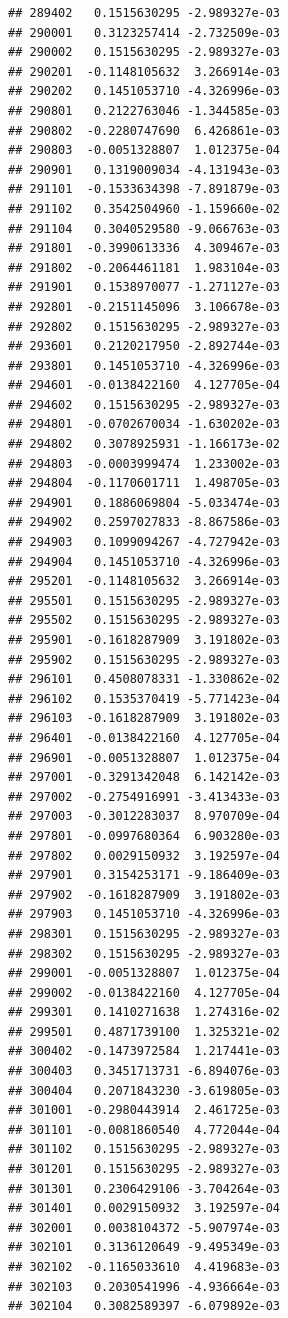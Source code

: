 \documentclass[ignorenonframetext,]{beamer}
\begin{document}
\begin{frame}[fragile]
\begin{verbatim}
## 289402   0.1515630295 -2.989327e-03
## 290001   0.3123257414 -2.732509e-03
## 290002   0.1515630295 -2.989327e-03
## 290201  -0.1148105632  3.266914e-03
## 290202   0.1451053710 -4.326996e-03
## 290801   0.2122763046 -1.344585e-03
## 290802  -0.2280747690  6.426861e-03
## 290803  -0.0051328807  1.012375e-04
## 290901   0.1319009034 -4.131943e-03
## 291101  -0.1533634398 -7.891879e-03
## 291102   0.3542504960 -1.159660e-02
## 291104   0.3040529580 -9.066763e-03
## 291801  -0.3990613336  4.309467e-03
## 291802  -0.2064461181  1.983104e-03
## 291901   0.1538970077 -1.271127e-03
## 292801  -0.2151145096  3.106678e-03
## 292802   0.1515630295 -2.989327e-03
## 293601   0.2120217950 -2.892744e-03
## 293801   0.1451053710 -4.326996e-03
## 294601  -0.0138422160  4.127705e-04
## 294602   0.1515630295 -2.989327e-03
## 294801  -0.0702670034 -1.630202e-03
## 294802   0.3078925931 -1.166173e-02
## 294803  -0.0003999474  1.233002e-03
## 294804  -0.1170601711  1.498705e-03
## 294901   0.1886069804 -5.033474e-03
## 294902   0.2597027833 -8.867586e-03
## 294903   0.1099094267 -4.727942e-03
## 294904   0.1451053710 -4.326996e-03
## 295201  -0.1148105632  3.266914e-03
## 295501   0.1515630295 -2.989327e-03
## 295502   0.1515630295 -2.989327e-03
## 295901  -0.1618287909  3.191802e-03
## 295902   0.1515630295 -2.989327e-03
## 296101   0.4508078331 -1.330862e-02
## 296102   0.1535370419 -5.771423e-04
## 296103  -0.1618287909  3.191802e-03
## 296401  -0.0138422160  4.127705e-04
## 296901  -0.0051328807  1.012375e-04
## 297001  -0.3291342048  6.142142e-03
## 297002  -0.2754916991 -3.413433e-03
## 297003  -0.3012283037  8.970709e-04
## 297801  -0.0997680364  6.903280e-03
## 297802   0.0029150932  3.192597e-04
## 297901   0.3154253171 -9.186409e-03
## 297902  -0.1618287909  3.191802e-03
## 297903   0.1451053710 -4.326996e-03
## 298301   0.1515630295 -2.989327e-03
## 298302   0.1515630295 -2.989327e-03
## 299001  -0.0051328807  1.012375e-04
## 299002  -0.0138422160  4.127705e-04
## 299301   0.1410271638  1.274316e-02
## 299501   0.4871739100  1.325321e-02
## 300402  -0.1473972584  1.217441e-03
## 300403   0.3451713731 -6.894076e-03
## 300404   0.2071843230 -3.619805e-03
## 301001  -0.2980443914  2.461725e-03
## 301101  -0.0081860540  4.772044e-04
## 301102   0.1515630295 -2.989327e-03
## 301201   0.1515630295 -2.989327e-03
## 301301   0.2306429106 -3.704264e-03
## 301401   0.0029150932  3.192597e-04
## 302001   0.0038104372 -5.907974e-03
## 302101   0.3136120649 -9.495349e-03
## 302102  -0.1165033610  4.419683e-03
## 302103   0.2030541996 -4.936664e-03
## 302104   0.3082589397 -6.079892e-03

\end{verbatim}
\end{frame}
\end{document}
